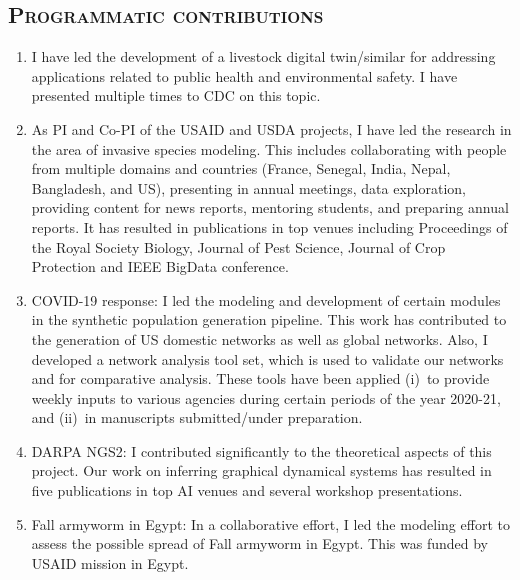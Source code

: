 \documentclass[margin,10pt]{res} %
\begin{document}
\begin{resume}
{\section{\textnormal{\textsc{Programmatic contributions}}}
\begin{enumerate}[$\circ$]
\item I have led the development of a livestock digital twin/similar for
addressing applications related to public health and environmental safety. 
I have presented multiple times to CDC on this topic.
\item As PI and Co-PI of the USAID and USDA projects, I have led the
research in the area of invasive species modeling. This includes
collaborating with people from multiple domains and countries (France,
Senegal, India, Nepal, Bangladesh, and US), presenting in annual meetings,
data exploration, providing content for news reports, mentoring students,
and preparing annual reports. It has resulted in publications in top venues
including Proceedings of the Royal Society Biology, Journal of Pest
Science, Journal of Crop Protection and IEEE BigData conference.
\item COVID-19 response: I led the modeling and development of certain
modules in the synthetic population generation pipeline. This work has
contributed to the generation of US domestic networks as well as global
networks. Also, I developed a network analysis tool set, which is used to
validate our networks and for comparative analysis. These tools have been
applied (i)~to provide weekly inputs to various agencies during certain
periods of the year 2020-21, and (ii)~in manuscripts submitted/under
preparation.
\item DARPA NGS2: I contributed significantly to the theoretical aspects of
this project. Our work on inferring graphical dynamical systems has
resulted in five publications in top AI venues and several workshop
presentations.
\item Fall armyworm in Egypt: In a collaborative effort, I led the modeling
effort to assess the possible spread of Fall armyworm in Egypt. This was
funded by USAID mission in Egypt.
\end{enumerate}

}
\end{resume}
\end{document}
